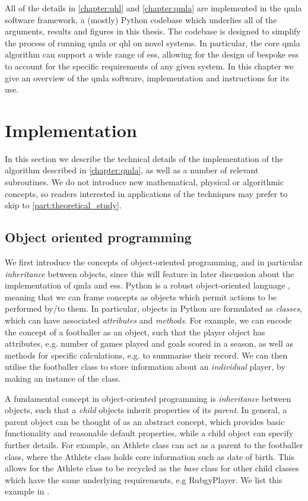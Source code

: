 All of the details in \cref{chapter:qhl} and \cref{chapter:qmla} are implemented in the \gls{qmla}
    software framework, a (mostly) Python codebase which underlies all of the 
    arguments, results and figures in this thesis. 
The codebase is designed to simplify the process of running \gls{qmla} or \gls{qhl}
    on novel systems.
In particular, the core \gls{qmla} algorithm can support a wide range of \glspl{es}, 
    allowing for the design of bespoke \glspl{es} to account for the specific requirements 
    of any given system. 
In this chapter we give an overview of the \gls{qmla} software, 
    implementation and instructions for its use. 

\section{Implementation}
In this section we describe the technical details of the implementation of the 
    algorithm described in \cref{chapter:qmla}, as well as a number of relevant subroutines. 
We do not introduce new mathematical, physical or algorithmic concepts, 
    so readers interested in applications of the techniques may prefer to skip to \cref{part:theoretical_study}.

\subsection{Object oriented programming}
We first introduce the concepts of object-oriented programming, 
    and in particular \emph{inheritance} between objects, 
    since this will feature in later discussion about the implementation of \gls{qmla}
    and \glspl{es}. 
Python is a robust object-oriented language \cite{python-manual}, meaning that we can frame 
    concepts as objects which permit actions to be performed by/to them. 
In particular, objects in Python are formulated as \emph{classes}, 
    which can have associated \emph{attributes} and \emph{methods}. 
For example, we can encode the concept of a footballer as an object,
    such that the player object has attributes, e.g. number of games played and goals scored in a season, 
    as well as methods for specific calculations, 
    e.g. to summarise their record.
We can then utilise the footballer class to store information about an \emph{individual} player, 
    by making an instance of the class.
\par 

A fundamental concept in object-oriented programming is \emph{inheritance} between objects, 
    such that a \emph{child} objects inherit properties of its \emph{parent}.
In general, a parent object can be thought of as an abstract concept, 
    which provides basic functionality and reasonable default properties,
    while a child object can specify further details. 
For example, an Athlete class can act as a parent to the footballer class, 
    where the Athlete class holds core information such as date of birth. 
This allows for the Athlete class to be recycled as the \emph{base} class for other child classes
    which have the same underlying requirements, e.g RubgyPlayer. 
We list this example in . 

